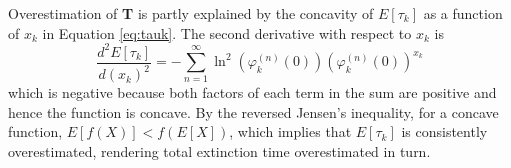\documentclass[9pt,lineno]{elife}
\begin{document}
\begin{appendixbox}
Overestimation of \textbf{T} is partly explained by the concavity of $E[\tau_k]$ as a function of $x_k$ in Equation \ref{eq:tauk}. %
The second derivative with respect to $x_k$ is 
\begin{equation*}
\frac{d^2E[\tau_k]}{d(x_k)^2} = -\sum \limits_{n=1}^\infty\ln^2\left(\varphi_{k}^{(n)}(0)\right)\left(\varphi_{k}^{(n)}(0)\right)^{x_{k}}
\end{equation*}
which is negative because both factors of each term in the sum are positive and hence the function is concave. By the reversed Jensen's inequality, for a concave function, $E[f(X)]<f(E[X])$, which implies that $E[\tau_k]$ is consistently overestimated, rendering total extinction time overestimated in turn. 

\end{appendixbox}
\end{document}
